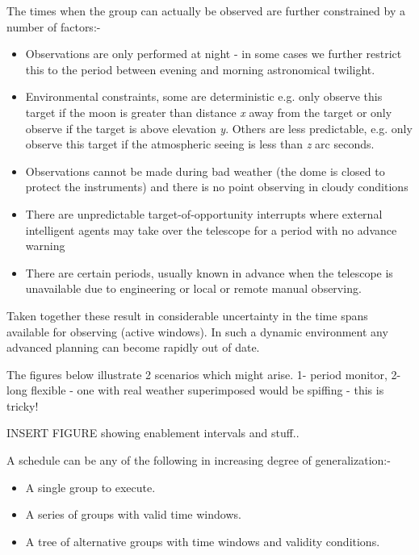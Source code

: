 The times when the group can actually be observed are further constrained by a number of factors:-
\begin{itemize}
\item Observations are only performed at night - in some cases we further restrict this to the period between evening and morning astronomical twilight.

\item Environmental constraints, some are deterministic e.g. only observe this target if the moon is greater than distance \emph{x} away from the target or only observe if the target is above elevation \emph{y}. Others are less predictable, e.g. only observe this target if the atmospheric seeing is less than \emph{z} arc seconds. 

\item Observations cannot be made during bad weather (the dome is closed to protect the instruments) and there is no point observing in cloudy conditions

\item There are unpredictable target-of-opportunity interrupts where external intelligent agents may take over the telescope for a period with no advance warning

\item There are certain periods, usually known in advance when the telescope is unavailable due to engineering or local or remote manual observing.

\end{itemize}

Taken together these result in considerable uncertainty in the time spans available for observing (active windows). In such a dynamic environment any advanced planning can become rapidly out of date. 


The figures below illustrate 2 scenarios which might arise. 1- period monitor, 2- long flexible - one with real weather superimposed would be spiffing - this is tricky!

%
INSERT FIGURE showing enablement intervals and stuff..
%

A schedule can be any of the following in increasing degree of generalization:-
\begin{itemize}
\item A single group to execute.
\item A series of groups with valid time windows.
\item A tree of alternative groups with time windows and validity conditions.
\end{itemize}

